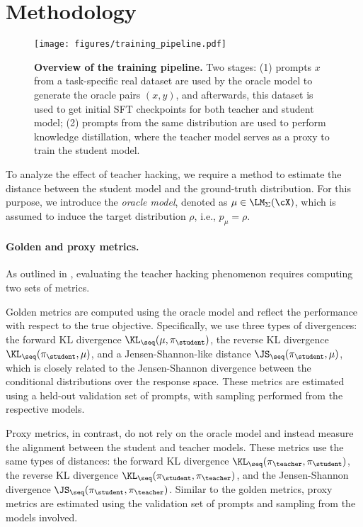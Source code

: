 \section{Methodology}\label{sec:methodology}
\begin{figure}
    \centering
    \texttt{[image: figures/training\_pipeline.pdf]}
    \caption{\textbf{Overview of the training pipeline.} Two stages: (1) prompts $x$ from a task-specific real dataset are used by the oracle model to generate the oracle pairs $(x,y)$, and afterwards, this dataset is used to get initial SFT checkpoints for both teacher and student model; (2) prompts from the same distribution are used to perform knowledge distillation, where the teacher model serves as a proxy to train the student model.}
    \label{fig:training_pipeline}
\end{figure}



To analyze the effect of teacher hacking, we require a method to estimate the distance between the student model and the ground-truth distribution. For this purpose, we introduce the \textit{oracle model}, denoted as $\mu \in \LM_\Sigma(\cX)$, which is assumed to induce the target distribution $\rho$, i.e., $p_{\mu} = \rho$.

\paragraph{Golden and proxy metrics.} As outlined in , evaluating the teacher hacking phenomenon requires computing two sets of metrics. 

Golden metrics are computed using the oracle model and reflect the performance with respect to the true objective. Specifically, we use three types of divergences: the forward KL divergence $\KL_{\seq}(\mu, \pi_{\student})$, the reverse KL divergence $\KL_{\seq}(\pi_{\student}, \mu)$, and a Jensen-Shannon-like distance $\JS_{\seq}(\pi_{\student}, \mu)$, which is closely related to the Jensen-Shannon divergence between the conditional distributions over the response space. These metrics are estimated using a held-out validation set of prompts, with sampling performed from the respective models.

Proxy metrics, in contrast, do not rely on the oracle model and instead measure the alignment between the student and teacher models. These metrics use the same types of distances: the forward KL divergence $\KL_{\seq}(\pi_{\teacher}, \pi_{\student})$, the reverse KL divergence $\KL_{\seq}(\pi_{\student}, \pi_{\teacher})$, and the Jensen-Shannon divergence $\JS_{\seq}(\pi_{\student}, \pi_{\teacher})$. Similar to the golden metrics, proxy metrics are estimated using the validation set of prompts and sampling from the models involved.



